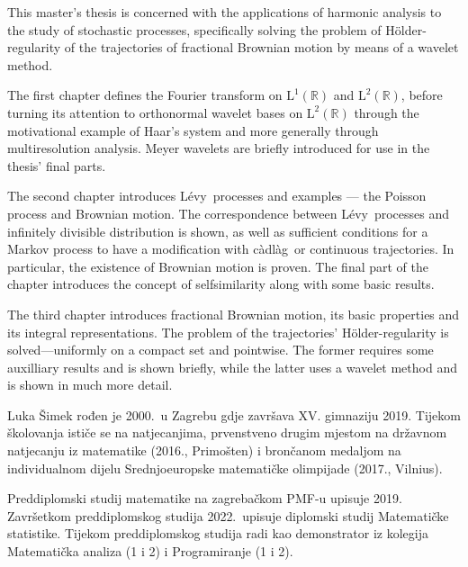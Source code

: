 \documentclass[a4paper,twoside,12pt]{memoir}
\numberwithin{teorem}{section}
\numberwithin{equation}{chapter}
\numberwithin{figure}{chapter}
\numberwithin{table}{chapter}
\newcommand{\R}{\mathbb{R}}
\newcommand{\holder}{H\" older}
\newcommand{\cadlag}{c\` adl\` ag}
\newcommand{\levy}{L\' evy}
\def\L{\mathrm{L}}
\begin{document}
\begin{summary}
	This master's thesis is concerned with the applications of harmonic analysis to the study
	of stochastic processes, specifically solving the problem of \holder -regularity of the trajectories
	of fractional Brownian motion by means of a wavelet method.

	The first chapter defines the Fourier transform on \( \L^1(\R) \) and
	\( \L^2(\R) \), before turning its attention to orthonormal wavelet bases
	on \( \L^2(\R) \) through the motivational example of Haar's system and
	more generally through multiresolution analysis. Meyer wavelets are briefly introduced
	for use in the thesis' final parts.

	The second chapter introduces \levy \ processes and examples --- the Poisson process and
	Brownian motion. The correspondence between \levy \ processes and infinitely divisible
	distribution is shown, as well as sufficient conditions for a Markov process to have a
	modification with \cadlag \ or continuous trajectories. In particular, the existence of
	Brownian motion is proven. The final part of the chapter introduces
	the concept of selfsimilarity along with some basic results.

	The third chapter introduces fractional Brownian motion, its basic properties and
	its integral representations. The problem of the trajectories' \holder -regularity
	is solved---uniformly on a compact set and pointwise. The former
	requires some auxilliary results and is shown briefly, while the latter
	uses a wavelet method and is shown in much more detail.
\end{summary}

\begin{cv}
	Luka Šimek rođen je 2000.\ u Zagrebu gdje završava XV. gimnaziju 2019. Tijekom školovanja ističe se na natjecanjima, prvenstveno drugim mjestom na državnom natjecanju iz matematike (2016., Primošten) i brončanom medaljom na individualnom dijelu Srednjoeuropske matematičke olimpijade (2017., Vilnius).

	Preddiplomski studij matematike na zagrebačkom PMF-u upisuje 2019. Završetkom preddiplomskog studija 2022.\ upisuje diplomski studij Matematičke statistike. Tijekom preddiplomskog studija radi kao demonstrator iz kolegija Matematička analiza (1 i 2) i Programiranje (1 i 2).
\end{cv}
\end{document}
